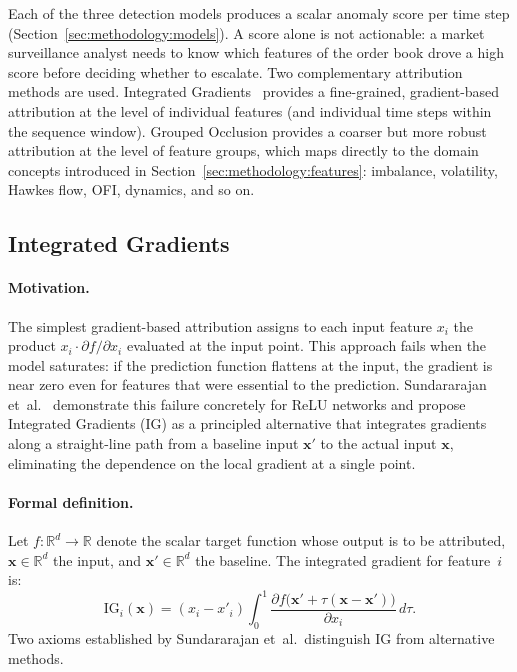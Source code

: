 \documentclass[11pt]{report}
\begin{document}
Each of the three detection models produces a scalar anomaly score per time step (Section~\ref{sec:methodology:models}). A score alone is not actionable: a market surveillance analyst needs to know which features of the order book drove a high score before deciding whether to escalate. Two complementary attribution methods are used. Integrated Gradients~\cite{sundararajan2017axiomaticattributiondeepnetworks} provides a fine-grained, gradient-based attribution at the level of individual features (and individual time steps within the sequence window). Grouped Occlusion provides a coarser but more robust attribution at the level of feature groups, which maps directly to the domain concepts introduced in Section~\ref{sec:methodology:features}: imbalance, volatility, Hawkes flow, OFI, dynamics, and so on.

\subsection{Integrated Gradients}\label{sec:methodology:interp:ig}

\paragraph{Motivation.}
The simplest gradient-based attribution assigns to each input feature $x_i$ the product $x_i \cdot \partial f / \partial x_i$ evaluated at the input point. This approach fails when the model saturates: if the prediction function flattens at the input, the gradient is near zero even for features that were essential to the prediction. Sundararajan et~al.~\cite{sundararajan2017axiomaticattributiondeepnetworks} demonstrate this failure concretely for ReLU networks and propose Integrated Gradients (IG) as a principled alternative that integrates gradients along a straight-line path from a baseline input $\mathbf{x}'$ to the actual input $\mathbf{x}$, eliminating the dependence on the local gradient at a single point.

\paragraph{Formal definition.}
Let $f : \mathbb{R}^d \to \mathbb{R}$ denote the scalar target function whose output is to be attributed, $\mathbf{x} \in \mathbb{R}^d$ the input, and $\mathbf{x}' \in \mathbb{R}^d$ the baseline. The integrated gradient for feature~$i$ is:
\begin{equation}
  \label{eq:ig}
  \mathrm{IG}_i(\mathbf{x}) = (x_i - x'_i) \int_0^1 \frac{\partial f\!\bigl(\mathbf{x}' + \tau(\mathbf{x} - \mathbf{x}')\bigr)}{\partial x_i}\, d\tau.
\end{equation}
Two axioms established by Sundararajan et~al.\ distinguish IG from alternative methods.
\end{document}
